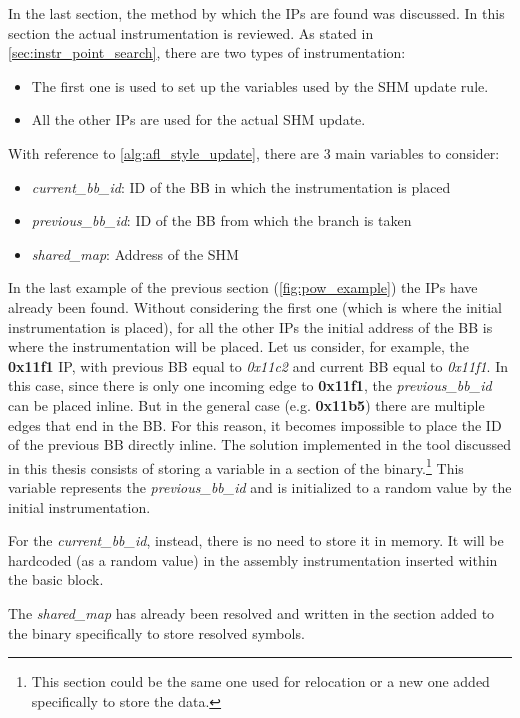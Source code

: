 In the last section, the method by which the \gls{IP}s are found was discussed.
In this section the actual instrumentation is reviewed.
As stated in \cref{sec:instr_point_search}, there are two types of instrumentation:
\begin{itemize}
    \item The first one is used to set up the variables used by the \gls{SHM} update rule.
    \item All the other \gls{IP}s are used for the actual \gls{SHM} update.
\end{itemize}
With reference to \cref{alg:afl_style_update}, there are 3 main variables to consider:
\begin{itemize}
    \item \textit{current\_bb\_id}: ID of the \gls{BB} in which the instrumentation is placed
    \item \textit{previous\_bb\_id}: ID of the \gls{BB} from which the branch is taken
    \item \textit{shared\_map}: Address of the \gls{SHM}
\end{itemize}
In the last example of the previous section (\cref{fig:pow_example}) the \gls{IP}s have already been found.
Without considering the first one (which is where the initial instrumentation is placed), for all the other \gls{IP}s the 
initial address of the \gls{BB} is where the instrumentation will be placed.
Let us consider, for example, the \textbf{0x11f1} \gls{IP}, with previous \gls{BB} equal to \textit{0x11c2} and current \gls{BB} equal to \textit{0x11f1}.
In this case, since there is only one incoming edge to \textbf{0x11f1}, the \textit{previous\_bb\_id} can be placed inline.
But in the general case (e.g. \textbf{0x11b5}) there are multiple edges that end in the \gls{BB}. For this reason, it becomes impossible to 
place the ID of the previous \gls{BB} directly inline.
The solution implemented in the tool discussed in this thesis consists of storing a variable in a section of the binary.\footnote{
    This section could be the same one used for relocation or a new one added specifically to store the data.
}
This variable represents the \textit{previous\_bb\_id} and is initialized to a random value by the initial instrumentation.

For the \textit{current\_bb\_id}, instead, there is no need to store it in memory. It will be hardcoded (as a random value) in the 
assembly instrumentation inserted within the basic block.

The \textit{shared\_map} has already been resolved and written in the section added to the binary specifically to store 
resolved symbols.

